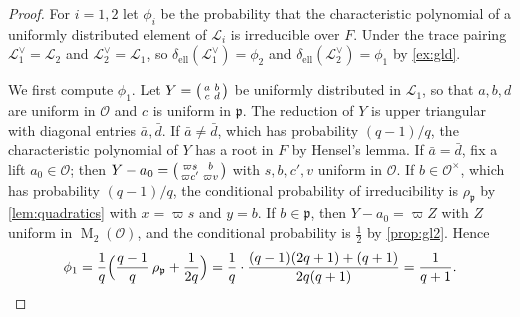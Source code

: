 \documentclass[11pt,reqno]{amsart}
\numberwithin{equation}{section}
\theoremstyle{plain}
\theoremstyle{definition}
\theoremstyle{remark}
\theoremstyle{plain}
\newcommand{\OO}{\mathcal{O}}    %
\newcommand{\pp}{\mathfrak{p}}   %
\newcommand{\Lat}{\mathcal{L}}   %
\newcommand{\g}{\mathfrak{g}}    %
\newcommand{\elld}[2][]{\delta_{\mathrm{ell}}^{#1}(#2)}  %
\DeclareMathOperator{\Mat}{M}
\begin{document}
\begin{proof}
For $i=1,2$ let $\phi_i$ be the probability that the characteristic
polynomial of a uniformly distributed element of $\Lat_i$ is irreducible
over $F$. Under the trace pairing $\Lat_1^\vee=\Lat_2$ and
$\Lat_2^\vee=\Lat_1$, so $\elld{\Lat_1^\vee}=\phi_2$ and
$\elld{\Lat_2^\vee}=\phi_1$ by \cref{ex:gld}.

We first compute $\phi_1$. Let
$Y=\begin{psmallmatrix}a&b\\c&d\end{psmallmatrix}$ be uniformly distributed in
$\Lat_1$, so that $a,b,d$ are uniform in $\OO$ and $c$ is uniform in $\pp$. The
reduction of $Y$ is upper triangular with diagonal entries $\bar a,\bar d$.
If $\bar a\ne\bar d$, which has probability $(q-1)/q$, the characteristic
polynomial of $Y$ has a root in $F$ by Hensel's lemma. If $\bar a=\bar d$, fix
a lift $a_0\in\OO$; then
$Y-a_0=\begin{psmallmatrix}\varpi s&b\\\varpi c'&\varpi v\end{psmallmatrix}$
with $s,b,c',v$ uniform in $\OO$. If $b\in\OO^\times$, which has
probability $(q-1)/q$, the conditional probability of irreducibility is
$\rho_{\pp}$ by \cref{lem:quadratics} with $x=\varpi s$ and $y=b$. If
$b\in\pp$, then $Y-a_0=\varpi Z$ with $Z$ uniform in $\Mat_2(\OO)$, and the
conditional probability is $\frac12$ by \cref{prop:gl2}. Hence
\[
\phi_1=\frac1q\Bigl(\frac{q-1}q\,\rho_{\pp}+\frac1{2q}\Bigr)
=\frac1q\cdot\frac{(q-1)(2q+1)+(q+1)}{2q(q+1)}=\frac1{q+1}.
\]


\end{proof}
\end{document}
